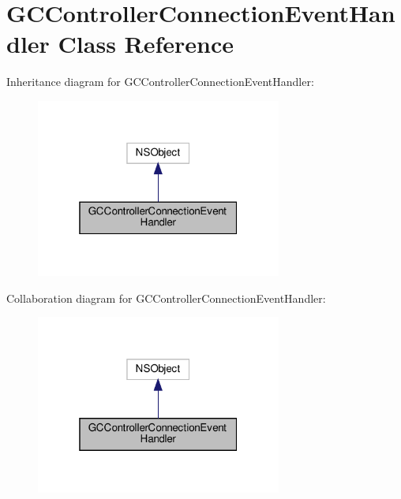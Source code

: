 \hypertarget{classGCControllerConnectionEventHandler}{}\section{G\+C\+Controller\+Connection\+Event\+Handler Class Reference}
\label{classGCControllerConnectionEventHandler}


Inheritance diagram for G\+C\+Controller\+Connection\+Event\+Handler\+:
\nopagebreak
\begin{figure}[H]
\begin{center}
\leavevmode
\includegraphics[width=229pt]{classGCControllerConnectionEventHandler__inherit__graph}
\end{center}
\end{figure}


Collaboration diagram for G\+C\+Controller\+Connection\+Event\+Handler\+:
\nopagebreak
\begin{figure}[H]
\begin{center}
\leavevmode
\includegraphics[width=229pt]{classGCControllerConnectionEventHandler__coll__graph}
\end{center}
\end{figure}
